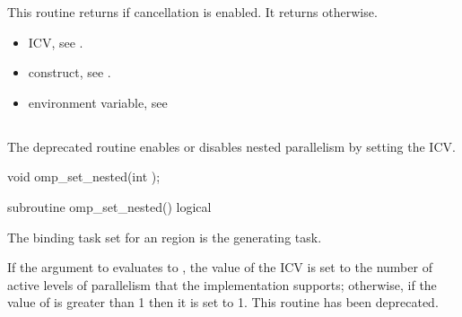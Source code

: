 \effect
This routine returns  if cancellation is enabled. It 
returns  otherwise.

\crossreferences
\begin{itemize}
\item {} ICV, see
.

\item {} construct, see .

\item {} environment variable, see
\end{itemize}



\subsection{}
\label{subsec:omp_set_nested}
\summary
The deprecated  routine enables or disables nested 
parallelism by setting the  ICV.


\format
\begin{ccppspecific}
\begin{ompcFunction}
void omp_set_nested(int );
\end{ompcFunction}
\end{ccppspecific}

\begin{fortranspecific}
\begin{ompfSubroutine}
subroutine omp_set_nested()
logical 
\end{ompfSubroutine}
\end{fortranspecific}

\binding
The binding task set for an  region is the generating task.

\effect
If the argument to  evaluates to , the value of
the  ICV is set to the number of active levels of
parallelism that the implementation supports; otherwise, if the value of
 is greater than 1 then it is set to 1.
This routine has been deprecated.

